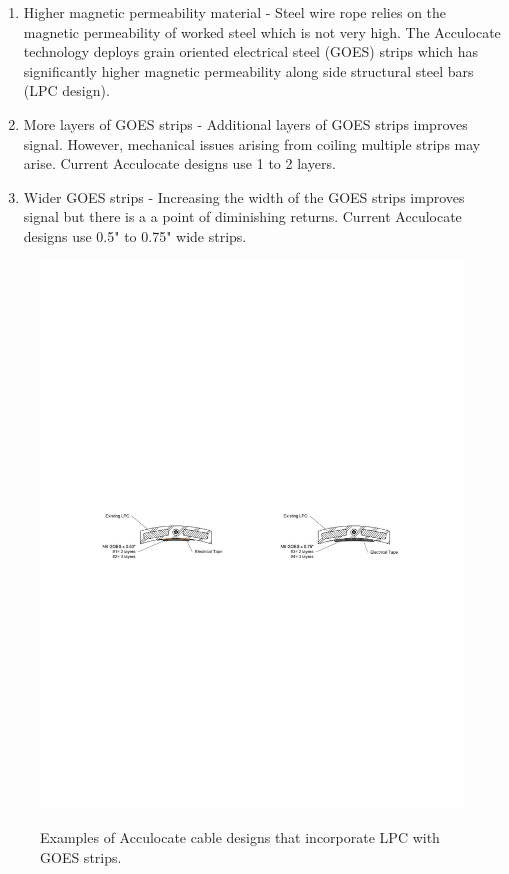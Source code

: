 \documentclass[paper=a4, fontsize=11pt]{scrartcl}
\numberwithin{equation}{section}		%
\numberwithin{figure}{section}			%
\numberwithin{table}{section}				%
\begin{document}
\begin{enumerate}
    \item Higher magnetic permeability material - Steel wire rope relies on the magnetic permeability of worked steel which is not very high.  The Acculocate technology deploys grain oriented electrical steel (GOES) strips which has significantly higher magnetic permeability along side structural steel bars (LPC design).  
    \item More layers of GOES strips - Additional layers of GOES strips improves signal.  However, mechanical issues arising from coiling multiple strips may arise.  Current Acculocate designs use 1 to 2 layers.
    \item Wider GOES strips - Increasing the width of the GOES strips improves signal but there is a a point of diminishing returns.  Current Acculocate designs use 0.5" to 0.75" wide strips.
\end{enumerate}

\begin{figure}[h!]
    \centering
    \caption{Examples of Acculocate cable designs that incorporate LPC with GOES strips.}
    \includegraphics[width=1.0\textwidth]{figures/acculocate_cables.pdf}
    \label{fig:cables}
\end{figure}
\end{document}
